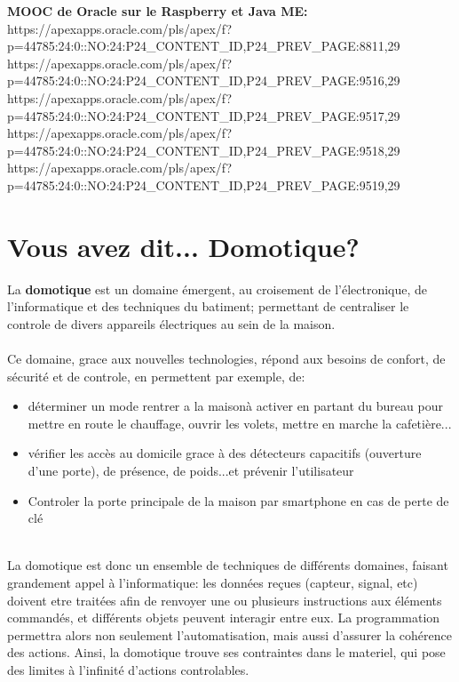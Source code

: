 \documentclass{article}
\begin{document}
\textbf{MOOC de Oracle sur le Raspberry et Java ME:}\\
https://apexapps.oracle.com/pls/apex/f?p=44785:24:0::NO:24:P24\_CONTENT\_ID,P24\_PREV\_PAGE:8811,29\\
https://apexapps.oracle.com/pls/apex/f?p=44785:24:0::NO:24:P24\_CONTENT\_ID,P24\_PREV\_PAGE:9516,29\\
https://apexapps.oracle.com/pls/apex/f?p=44785:24:0::NO:24:P24\_CONTENT\_ID,P24\_PREV\_PAGE:9517,29\\
https://apexapps.oracle.com/pls/apex/f?p=44785:24:0::NO:24:P24\_CONTENT\_ID,P24\_PREV\_PAGE:9518,29\\
https://apexapps.oracle.com/pls/apex/f?p=44785:24:0::NO:24:P24\_CONTENT\_ID,P24\_PREV\_PAGE:9519,29\\


\section*{Vous avez dit... Domotique?}
La \textbf{domotique} est un domaine émergent, au croisement de l'électronique, de l'informatique et des techniques du batiment; permettant de centraliser le controle de divers appareils électriques au sein de la maison.\\
\\
Ce domaine, grace aux nouvelles technologies, répond aux besoins de confort, de sécurité et de controle, en permettent par exemple, de:
\begin{itemize}
  \item déterminer un mode \og rentrer a la maison\fg  à activer en partant du bureau pour mettre en route le chauffage, ouvrir les volets, mettre en marche la cafetière...
  \item vérifier les accès au domicile grace à des détecteurs capacitifs (ouverture d'une porte), de présence, de poids...et prévenir l'utilisateur
  \item Controler la porte principale de la maison par smartphone en cas de perte de clé
\end{itemize}
\\
\newline
La domotique est donc un ensemble de techniques de différents domaines, faisant grandement appel à l'informatique: les données reçues (capteur, signal, etc) doivent etre traitées afin de renvoyer une ou plusieurs instructions aux éléments commandés, et différents objets peuvent interagir entre eux. La programmation permettra alors non seulement l'automatisation, mais aussi d'assurer la cohérence des actions.
Ainsi, la domotique trouve ses contraintes dans le materiel, qui pose des limites à l'infinité d'actions controlables.
\end{document}
